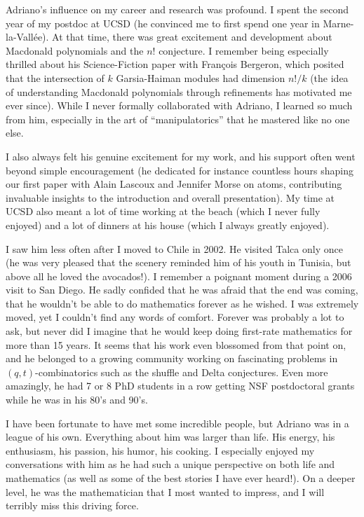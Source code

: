 \documentclass{notices}
\begin{document}
Adriano's influence on my career and research was profound. I spent the second year of my postdoc at UCSD (he convinced me to first spend one year in Marne-la-Vallée). At that time, there was great excitement and development about Macdonald polynomials and  the $n!$ conjecture. I remember being especially thrilled about his Science-Fiction paper with Fran\c{c}ois Bergeron, which posited that the intersection of $k$ Garsia-Haiman modules had dimension $n!/k$ (the idea of understanding Macdonald polynomials through refinements has motivated me ever since). While I never formally collaborated with Adriano, I learned so much from him, especially in the art of ``manipulatorics'' that he mastered like no one else. 

I also always felt his genuine excitement for my work, and  his support often went beyond simple encouragement (he dedicated for instance countless hours shaping our first paper with Alain Lascoux and Jennifer Morse on atoms, contributing invaluable insights to the introduction and overall presentation). My time at UCSD also meant a lot of time working at the beach (which I never fully enjoyed) and a lot of dinners at his house (which I always greatly enjoyed).

I saw him less often after I moved to Chile in 2002.  He visited Talca only once (he was very pleased that the scenery reminded him of his youth in Tunisia, but above all he loved the avocados!). I remember a poignant moment during a 2006 visit to San Diego. He sadly confided that he was afraid that the end was coming, that he wouldn't be able to do mathematics forever as he wished. I was extremely moved, yet I couldn't find any words of comfort. Forever was probably a lot to ask, but never did I imagine that he would keep doing first-rate mathematics for more than 15 years.  It seems that his work  even blossomed from that point on, and he belonged to a growing community working on fascinating problems in $(q,t)$-combinatorics such as the shuffle and Delta conjectures. Even more amazingly, he had 7 or 8 PhD students in a row getting NSF postdoctoral grants while he was in his 80's and 90's.

I have been fortunate to have met some incredible people, but Adriano was in a league of his own. Everything about him was larger than life. His energy, his enthusiasm, his passion, his humor, his cooking. I especially enjoyed my conversations with him as he had such a unique perspective  on both life and  mathematics (as well as some of the best stories I have ever heard!). On a deeper level, he was the mathematician that I most wanted to impress, and I will terribly miss this driving force.
\end{document}
